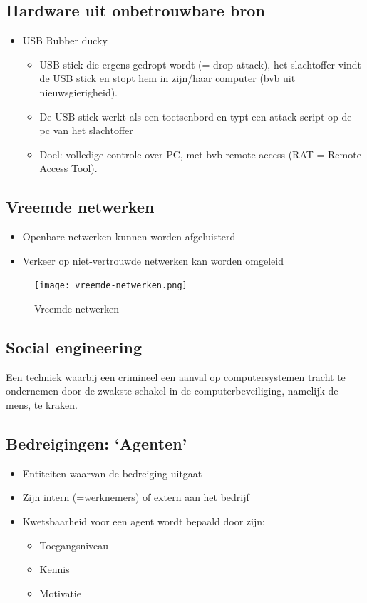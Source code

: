 \documentclass{article}
\begin{document}
\subsection{Hardware uit onbetrouwbare bron}
\begin{itemize}
    \item USB Rubber ducky
    \begin{itemize}
        \item USB-stick die ergens gedropt wordt (= drop attack), het slachtoffer vindt de USB stick en stopt hem in zijn/haar computer (bvb uit nieuwsgierigheid).
        \item De USB stick werkt als een toetsenbord en typt een attack script op de pc van het slachtoffer
        \item Doel: volledige controle over PC, met bvb remote access (RAT = Remote Access Tool).
    \end{itemize}
\end{itemize}

\subsection{Vreemde netwerken}
\begin{itemize}
    \item Openbare netwerken kunnen worden afgeluisterd
    \item Verkeer op niet-vertrouwde netwerken kan worden omgeleid
\end{itemize}

\begin{figure}[H]
    \centering
    \texttt{[image: vreemde-netwerken.png]}
    \caption{Vreemde netwerken}
\end{figure}

\subsection{Social engineering}
Een techniek waarbij een crimineel een aanval op computersystemen tracht te ondernemen door de zwakste schakel in de computerbeveiliging, namelijk de mens, te kraken.


\subsection{Bedreigingen: `Agenten'}

\begin{itemize}
    \item Entiteiten waarvan de bedreiging uitgaat
    \item Zijn intern (=werknemers) of extern aan het bedrijf
    \item Kwetsbaarheid voor een agent wordt bepaald door zijn: 
    \begin{itemize}
        \item Toegangsniveau
        \item Kennis
        \item Motivatie
    \end{itemize}
\end{itemize}
\end{document}
